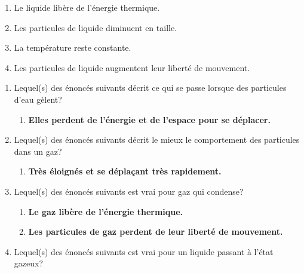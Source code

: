 \documentclass[
  11pt,
  a4paper,
  openany]{book}
\providecommand{\tightlist}{%
  \setlength{\itemsep}{0pt}\setlength{\parskip}{0pt}}
\begin{document}
\begin{Exercise}
\begin{enumerate}
  \begin{enumerate}
  \def\labelenumii{\alph{enumii}.}
  \tightlist
  \item
    Le liquide libère de l'énergie thermique.
  \item
    Les particules de liquide diminuent en taille.
  \item
    La température reste constante.
  \item
    Les particules de liquide augmentent leur liberté de mouvement.
  \end{enumerate}
\end{enumerate}

\end{Exercise}

\begin{Answer}

\begin{enumerate}
\def\labelenumi{\arabic{enumi}.}
\tightlist
\item
  Lequel(s) des énoncés suivants décrit ce qui se passe lorsque des particules d'eau gèlent?

  \begin{enumerate}
  \def\labelenumii{\alph{enumii}.}
  \setcounter{enumii}{3}
  \tightlist
  \item
    \textbf{Elles perdent de l'énergie et de l'espace pour se déplacer.}
  \end{enumerate}
\item
  Lequel(s) des énoncés suivants décrit le mieux le comportement des particules dans un gaz?

  \begin{enumerate}
  \def\labelenumii{\alph{enumii}.}
  \setcounter{enumii}{3}
  \tightlist
  \item
    \textbf{Très éloignés et se déplaçant très rapidement.}
  \end{enumerate}
\item
  Lequel(s) des énoncés suivants est vrai pour gaz qui condense?

  \begin{enumerate}
  \def\labelenumii{\alph{enumii}.}
  \tightlist
  \item
    \textbf{Le gaz libère de l'énergie thermique.}
  \item
    \textbf{Les particules de gaz perdent de leur liberté de mouvement.}
  \end{enumerate}
\item
  Lequel(s) des énoncés suivants est vrai pour un liquide passant à l'état gazeux?


\end{enumerate}
\end{Answer}
\end{document}

